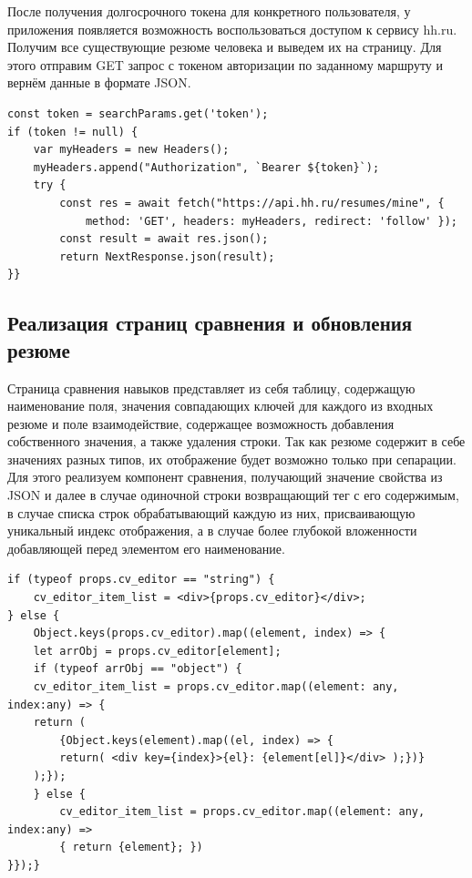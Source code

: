 \documentclass[master, och, pract]{SCWorks}
\begin{document}
После получения долгосрочного токена для конкретного пользователя, у приложения появляется возможность воспользоваться доступом к сервису hh.ru. Получим все существующие резюме человека и выведем их на страницу. Для этого отправим GET запрос с токеном авторизации по заданному маршруту и вернём данные в формате JSON.
\begin{verbatim}
const token = searchParams.get('token');
if (token != null) {
    var myHeaders = new Headers();
    myHeaders.append("Authorization", `Bearer ${token}`);
    try {
        const res = await fetch("https://api.hh.ru/resumes/mine", {
            method: 'GET', headers: myHeaders, redirect: 'follow' });      
        const result = await res.json();
        return NextResponse.json(result);
}}
\end{verbatim}




\subsection{Реализация страниц сравнения и обновления резюме}
Страница сравнения навыков представляет из себя таблицу, содержащую наименование поля, значения совпадающих ключей для каждого из входных резюме и поле взаимодействие, содержащее возможность добавления собственного значения, а также удаления строки. Так как резюме содержит в себе значениях разных типов, их отображение будет возможно только при сепарации. Для этого реализуем компонент сравнения, получающий значение свойства из JSON и далее в случае одиночной строки возвращающий тег с его содержимым, в случае списка строк обрабатывающий каждую из них, присваивающую уникальный индекс отображения, а в случае более глубокой вложенности добавляющей перед элементом его наименование.
\begin{verbatim}
if (typeof props.cv_editor == "string") {
    cv_editor_item_list = <div>{props.cv_editor}</div>;
} else {
    Object.keys(props.cv_editor).map((element, index) => {
    let arrObj = props.cv_editor[element];
    if (typeof arrObj == "object") {
    cv_editor_item_list = props.cv_editor.map((element: any, index:any) => {
    return (
        {Object.keys(element).map((el, index) => {
        return( <div key={index}>{el}: {element[el]}</div> );})}
    );});  
    } else {
        cv_editor_item_list = props.cv_editor.map((element: any, index:any) => 
        { return {element}; })
}});}
\end{verbatim}
\end{document}
